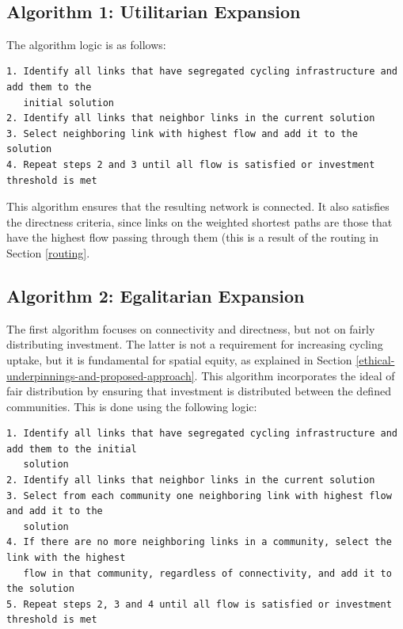 \documentclass[
]{article}
\begin{document}
~

\hypertarget{algorithm-1-utilitarian-expansion}{%
\subsection{Algorithm 1: Utilitarian Expansion}\label{algorithm-1-utilitarian-expansion}}

The algorithm logic is as follows:

\begin{verbatim}
1. Identify all links that have segregated cycling infrastructure and add them to the 
   initial solution
2. Identify all links that neighbor links in the current solution
3. Select neighboring link with highest flow and add it to the solution
4. Repeat steps 2 and 3 until all flow is satisfied or investment threshold is met
\end{verbatim}

This algorithm ensures that the resulting network is connected. It also
satisfies the directness criteria, since links on the weighted shortest
paths are those that have the highest flow passing through them (this is
a result of the routing in Section \ref{routing}.

\hypertarget{algorithm-2-egalitarian-expansion}{%
\subsection{Algorithm 2: Egalitarian Expansion}\label{algorithm-2-egalitarian-expansion}}

The first algorithm focuses on connectivity and directness, but not on
fairly distributing investment. The latter is not a requirement for
increasing cycling uptake, but it is fundamental for spatial equity, as
explained in Section \ref{ethical-underpinnings-and-proposed-approach}. This algorithm incorporates
the ideal of fair distribution by ensuring that investment is distributed between the defined communities.
This is done using the following logic:

\begin{verbatim}
1. Identify all links that have segregated cycling infrastructure and add them to the initial
   solution
2. Identify all links that neighbor links in the current solution
3. Select from each community one neighboring link with highest flow and add it to the
   solution
4. If there are no more neighboring links in a community, select the link with the highest
   flow in that community, regardless of connectivity, and add it to the solution
5. Repeat steps 2, 3 and 4 until all flow is satisfied or investment threshold is met
\end{verbatim}
\end{document}

